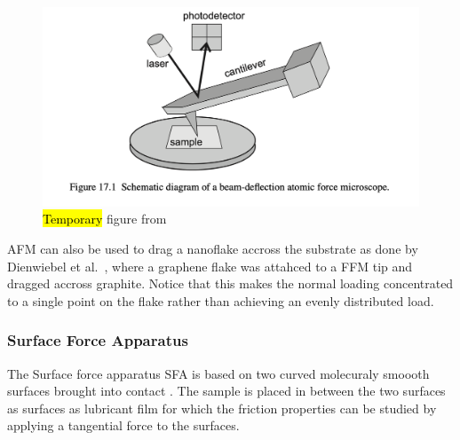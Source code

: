 \begin{figure}[H]
  \centering
  \includegraphics[width=0.6\linewidth]{figures/theory/AFM.png}
  \caption{\hl{Temporary} figure from \cite[p. 184]{gnecco_meyer_2015}}
  \label{fig:AFM}
\end{figure}


\acrshort{AFM} can also be used to drag a nanoflake accross the substrate as done by
Dienwiebel et al.\ \cite{DIENWIEBEL2005197}, where a graphene flake was attahced
to a \acrshort{FFM} tip and dragged accross graphite. Notice that this makes the normal
loading concentrated to a single point on the flake rather than achieving an evenly distributed load. 



\subsubsection{Surface Force Apparatus}
The Surface force apparatus \acrshort{SFA} is based on two curved molecuraly smoooth surfaces brought into contact \cite[p. 188]{gnecco_meyer_2015}. The sample is placed in between the two surfaces as surfaces as lubricant film for which the friction properties can be studied by applying a tangential force to the surfaces. 











